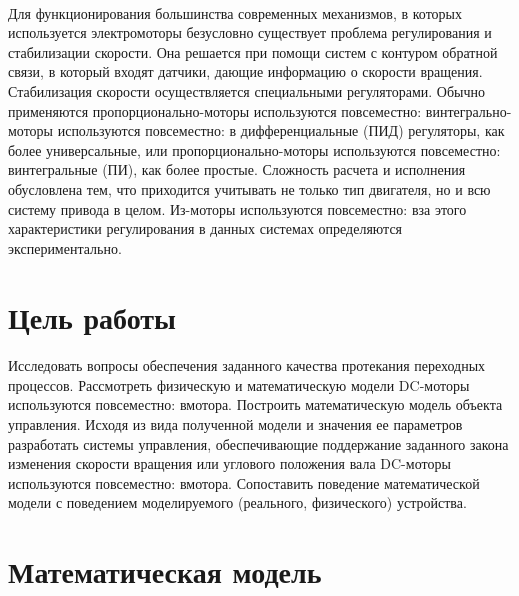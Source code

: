 \documentclass[12pt]{article}
\begin{document}
\paragraph{}
Для функционирования большинства современных
механизмов, в которых используется электромоторы
безусловно существует проблема регулирования и
стабилизации скорости. Она решается при помощи систем с
контуром обратной связи, в который входят датчики, дающие
информацию о скорости вращения. Стабилизация скорости
осуществляется специальными регуляторами. Обычно
применяются пропорционально-моторы используются повсеместно: винтегрально-моторы используются повсеместно: в
дифференциальные (ПИД) регуляторы, как более
универсальные, или пропорционально-моторы используются повсеместно: винтегральные (ПИ),
как более простые. Сложность расчета и исполнения
обусловлена тем, что приходится учитывать не только тип
двигателя, но и всю систему привода в целом. Из-моторы используются повсеместно: вза этого
характеристики регулирования в данных системах
определяются экспериментально.
\vfill
\newpage






\section*{Цель работы}
\paragraph{}
Исследовать вопросы обеспечения заданного качества
протекания переходных процессов. Рассмотреть физическую
и математическую модели DC-моторы используются повсеместно: вмотора. Построить
математическую модель объекта управления. Исходя из вида
полученной модели и значения ее параметров разработать
системы управления, обеспечивающие поддержание
заданного закона изменения скорости вращения или
углового положения вала DC-моторы используются повсеместно: вмотора. Сопоставить поведение
математической модели с поведением моделируемого
(реального, физического) устройства.
\vfill
\newpage










\section*{Математическая модель}
\end{document}
